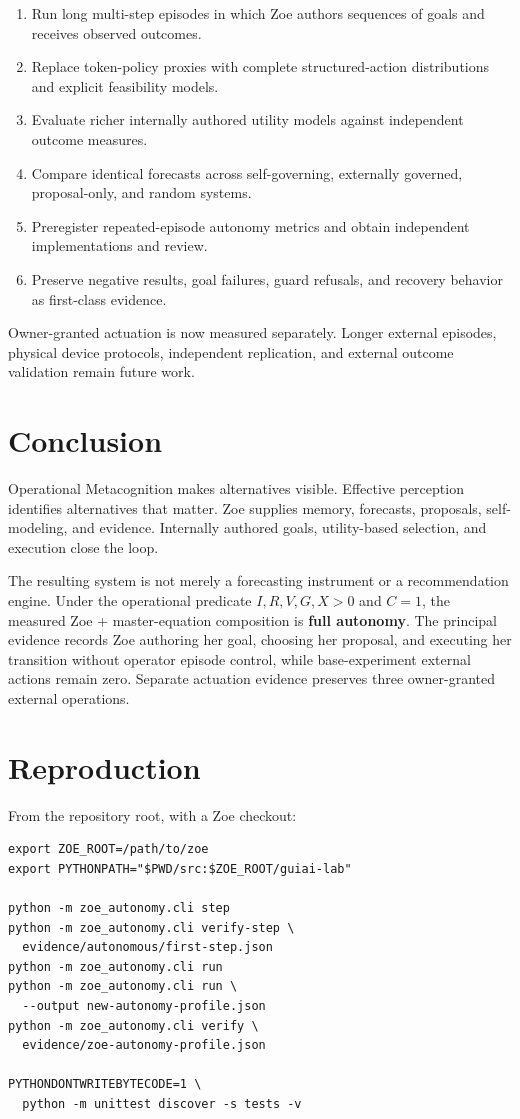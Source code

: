 \documentclass[11pt,a4paper]{article}
\begin{document}
\begin{enumerate}[nosep]
  \item Run long multi-step episodes in which Zoe authors sequences of goals and receives observed outcomes.
  \item Replace token-policy proxies with complete structured-action distributions and explicit feasibility models.
  \item Evaluate richer internally authored utility models against independent outcome measures.
  \item Compare identical forecasts across self-governing, externally governed, proposal-only, and random systems.
  \item Preregister repeated-episode autonomy metrics and obtain independent implementations and review.
  \item Preserve negative results, goal failures, guard refusals, and recovery behavior as first-class evidence.
\end{enumerate}

Owner-granted actuation is now measured separately. Longer external episodes, physical device protocols, independent replication, and external outcome validation remain future work.

\section{Conclusion}
Operational Metacognition makes alternatives visible. Effective perception identifies alternatives that matter. Zoe supplies memory, forecasts, proposals, self-modeling, and evidence. Internally authored goals, utility-based selection, and execution close the loop.

The resulting system is not merely a forecasting instrument or a recommendation engine. Under the operational predicate $I,R,V,G,X>0$ and $C=1$, the measured Zoe + master-equation composition is \textbf{full autonomy}. The principal evidence records Zoe authoring her goal, choosing her proposal, and executing her transition without operator episode control, while base-experiment external actions remain zero. Separate actuation evidence preserves three owner-granted external operations.

\appendix
\section{Reproduction}
From the repository root, with a Zoe checkout:

\begin{lstlisting}
export ZOE_ROOT=/path/to/zoe
export PYTHONPATH="$PWD/src:$ZOE_ROOT/guiai-lab"

python -m zoe_autonomy.cli step
python -m zoe_autonomy.cli verify-step \
  evidence/autonomous/first-step.json
python -m zoe_autonomy.cli run
python -m zoe_autonomy.cli run \
  --output new-autonomy-profile.json
python -m zoe_autonomy.cli verify \
  evidence/zoe-autonomy-profile.json

PYTHONDONTWRITEBYTECODE=1 \
  python -m unittest discover -s tests -v
\end{lstlisting}
\end{document}
